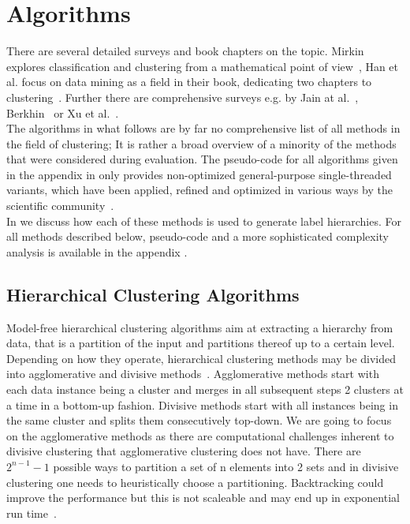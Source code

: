 \chapter{Algorithms}\label{\positionnumber}
There are several detailed surveys and book chapters on the topic. Mirkin explores classification and clustering from a mathematical point of view~\cite{mirkin2013mathematical}, Han et al. focus on data mining as a field in their book, dedicating two chapters to clustering~\cite{han2011data}. Further there are comprehensive surveys e.g. by Jain at al.~\cite{overview_clust}, Berkhin~\cite{berkhin2006survey} or Xu et al.~\cite{xu2005survey}.  \\
The algorithms in what follows are by far no comprehensive list of all methods in the field of clustering; It is rather a broad overview of a minority of the methods that were considered during evaluation. The pseudo-code for all algorithms given in the appendix in  only provides non-optimized general-purpose single-threaded variants, which have been applied, refined and optimized in various ways by the scientific community~\cite{han2011data}. \\
In  we discuss how each of these methods is used to generate label hierarchies. 
For all methods described below, pseudo-code and a more sophisticated complexity analysis is available in the appendix . \\

\section{Hierarchical Clustering Algorithms}\label{\positionnumber}
Model-free hierarchical clustering algorithms aim at extracting a hierarchy from data, that is a partition of the input and partitions thereof up to a certain level. Depending on how they operate, hierarchical clustering methods may be divided into agglomerative and divisive methods~\cite{han2011data}. Agglomerative methods start with each data instance being a cluster and merges in all subsequent steps 2 clusters at a time in a bottom-up fashion. Divisive methods start with all instances being in the same cluster and splits them consecutively top-down. We are going to focus on the agglomerative methods as there are computational challenges inherent to divisive clustering that agglomerative clustering does not have. There are $2^{n-1}-1$ possible ways to partition a set of n elements into 2 sets and in divisive clustering one needs to heuristically choose a partitioning. Backtracking could improve the performance but this is not scaleable and may end up in exponential run time~\cite{han2011data}. \\

